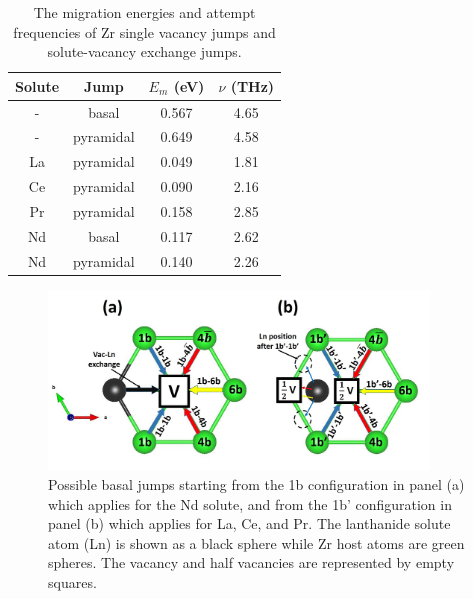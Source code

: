 \documentclass[preprint,12pt]{elsarticle}
\begin{document}
\begin{table}[h!]
    \centering
    \caption{The migration energies and attempt frequencies of Zr single vacancy jumps and solute-vacancy exchange jumps.}
    \begin{tabular}{c|c|c|c}
    \toprule
        Solute & Jump & $E_m$ (eV) & $\nu$ (THz) \\
        \hline
       -  &basal&0.567 & 4.65\\
       - &pyramidal &0.649 & 4.58\\
       \hline
       La&pyramidal &0.049 &1.81 \\
       Ce&pyramidal &0.090 &2.16 \\
       Pr&pyramidal &0.158 &2.85 \\
       Nd&basal &0.117 &2.62 \\
       Nd&pyramidal &0.140 &2.26 \\
       \bottomrule
    \end{tabular}
    \label{tab:jumps}
\end{table}

\begin{figure}[h!]
    \centering
    \includegraphics[width=0.9\textwidth]{2_basal_jumps_1b_1bb.jpg}
    \caption{Possible basal jumps starting from the 1b configuration in panel (a) which applies for the Nd solute, and from the 1b' configuration in panel (b) which applies for La, Ce, and Pr. The lanthanide solute atom (Ln) is shown as a black sphere while Zr host atoms are green spheres. The vacancy and half vacancies are represented by empty squares. }
    \label{fig:basal_jumps_1b_and_1bb}
\end{figure}
\end{document}
